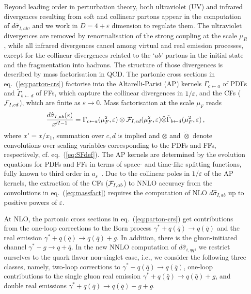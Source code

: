 \documentclass[%
 twocolumn,
 superscriptaddress,
 preprintnumbers,
 nofootinbib,
 amsmath,amssymb,
 aps,
 prl,
]{revtex4}
\begin{document}
Beyond leading order in perturbation theory, both ultraviolet (UV) and infrared divergences resulting from soft and collinear partons appear in the computation of $d\hat \sigma_{I,ab}$, and we work in $D=4+\varepsilon$ dimension to regulate them.
The ultraviolet divergences are removed by renormalisation of the strong coupling at the scale $\mu_R$, while all infrared divergences cancel among virtual and real emission processes, except for the collinear divergences related to the `$ab$' partons in the initial state and the fragmentation into hadrons. 
The structure of those divergences is described by mass factorisation in QCD. 
The partonic cross sections in eq.~(\ref{eq:parton-crs}) factorise into the Altarelli-Parisi (AP) kernels 
$\Gamma_{c\leftarrow a}$ of PDFs and $\tilde \Gamma_{b\leftarrow d}$ of FFs, which capture the collinear divergences in $1/\varepsilon$,
and the CFs (${\cal F}_{I,cd}$), which are finite as $\varepsilon \rightarrow 0$.
Mass factorisation at the scale $\mu_F$ reads
%
\begin{eqnarray}
\label{eq:massfact}
\frac{d\hat \sigma_{I,ab}(\varepsilon)}{x'^{I-1}} = 
\Gamma_{c\leftarrow a}(\mu_F^2,\varepsilon) \otimes 
{\cal F}_{I,cd}(\mu_F^2,\varepsilon) \tilde \otimes 
\tilde \Gamma_{b\leftarrow d}(\mu_F^2,\varepsilon)
\, ,
\, 
\end{eqnarray}  
%
where $x'=x/x_1$, summation over $c,d$ is implied and $\otimes$ and $\tilde \otimes$ denote
convolutions over scaling variables corresponding to the PDFs and FFs, respectively,
cf. eq.~(\ref{eq:SFdef}).
The AP kernels are determined by the evolution equations for PDFs and FFs in terms of space- and time-like splitting functions, fully known to third order in $a_s$~\cite{Moch:2004pa,Vogt:2004mw,Almasy:2011eq,Chen:2020uvt}.
Due to the collinear poles in $1/\varepsilon$ of the AP kernels, the extraction of the CFs (${\cal F}_{I,ab}$) to NNLO accuracy from the convolutions in eq.~(\ref{eq:massfact}) requires the computation of NLO $d\hat \sigma_{I,ab}$ up to positive powers of $\varepsilon$.

At NLO, the partonic cross sections in eq.~(\ref{eq:parton-crs}) get contributions from 
the one-loop corrections to the Born process $\gamma^*+q (\bar{q}) \rightarrow q (\bar{q})$
and the real emission $\gamma^* + q (\bar{q}) \rightarrow q (\bar{q}) + g$. 
In addition, there is the gluon-initiated channel $\gamma^* + g \rightarrow q + \bar{q}$.
In the new NNLO computation of $d\hat \sigma_{i,qq}$, we restrict ourselves to the quark flavor 
non-singlet case, i.e., we consider the following three classes, namely, 
two-loop corrections to $\gamma^* + q(\bar{q}) \rightarrow q(\bar{q})$,
one-loop contributions to the single gluon real emission $\gamma^* + q (\bar{q}) \rightarrow q (\bar{q}) + g$, 
and double real emissions $\gamma^* + q(\bar{q}) \rightarrow q(\bar{q}) + g + g$.  
\end{document}
